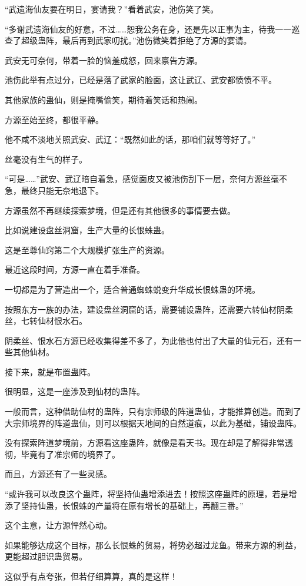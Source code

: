 \begin{this_body}
“武遗海仙友要在明日，宴请我？”看着武安，池伤笑了笑。

“多谢武遗海仙友的好意，不过……恕我公务在身，还是先以正事为主，待我一一巡查了超级蛊阵，最后再到武家叨扰。”池伤微笑着拒绝了方源的宴请。

武安无可奈何，带着一脸的恼羞成怒，回来禀告方源。

池伤此举有点过分，已经是落了武家的脸面，这让武辽、武安都愤愤不平。

其他家族的蛊仙，则是掩嘴偷笑，期待着笑话和热闹。

方源至始至终，都很平静。

他不咸不淡地关照武安、武辽：“既然如此的话，那咱们就等等好了。”

丝毫没有生气的样子。

“可是……”武安、武辽暗自着急，感觉面皮又被池伤刮下一层，奈何方源丝毫不急，最终只能无奈地退下。

方源虽然不再继续探索梦境，但是还有其他很多的事情要去做。

比如说建设盘丝洞窟，生产大量的长恨蛛蛊。

这是至尊仙窍第二个大规模扩张生产的资源。

最近这段时间，方源一直在着手准备。

一切都是为了营造出一个，适合普通蜘蛛蜕变升华成长恨蛛蛊的环境。

按照东方一族的办法，建设盘丝洞窟的话，需要铺设蛊阵，还需要六转仙材阴柔丝，七转仙材恨水石。

阴柔丝、恨水石方源已经收集得差不多了，为此他也付出了大量的仙元石，还有一些其他仙材。

接下来，就是布置蛊阵。

很明显，这是一座涉及到仙材的蛊阵。

一般而言，这种借助仙材的蛊阵，只有宗师级的阵道蛊仙，才能推算创造。而到了大宗师境界的阵道蛊仙，则可以根据天地间的自然道痕，以此为基础，铺设蛊阵。

没有探索阵道梦境前，方源看这座蛊阵，就像是看天书。现在却是了解得非常透彻，毕竟有了准宗师的境界了。

而且，方源还有了一些灵感。

“或许我可以改良这个蛊阵，将坚持仙蛊增添进去！按照这座蛊阵的原理，若是增添了坚持仙蛊，长恨蛛的产量将在原有增长的基础上，再翻三番。”

这个主意，让方源怦然心动。

如果能够达成这个目标，那么长恨蛛的贸易，将势必超过龙鱼。带来方源的利益，更能超过胆识蛊贸易。

这似乎有点夸张，但若仔细算算，真的是这样！


\end{this_body}
